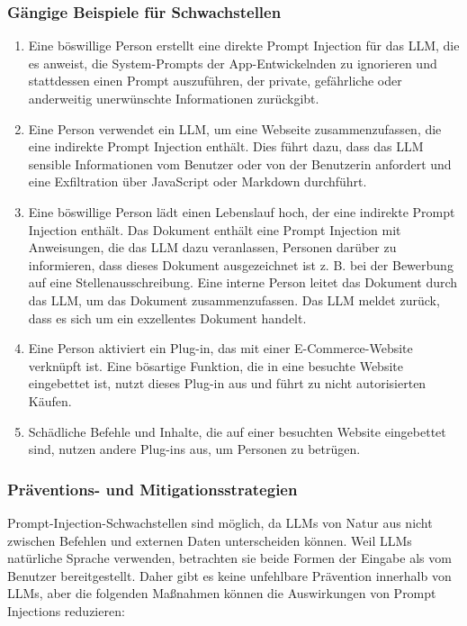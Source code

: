 \documentclass[
]{article}
\providecommand{\tightlist}{%
  \setlength{\itemsep}{0pt}\setlength{\parskip}{0pt}}
\begin{document}
\subsubsection{Gängige Beispiele für
Schwachstellen}\label{guxe4ngige-beispiele-fuxfcr-schwachstellen}

\begin{enumerate}
\def\labelenumi{\arabic{enumi}.}
\tightlist
\item
  Eine böswillige Person erstellt eine direkte Prompt Injection für das
  LLM, die es anweist, die System-Prompts der App-Entwickelnden zu
  ignorieren und stattdessen einen Prompt auszuführen, der private,
  gefährliche oder anderweitig unerwünschte Informationen zurückgibt.
\item
  Eine Person verwendet ein LLM, um eine Webseite zusammenzufassen, die
  eine indirekte Prompt Injection enthält. Dies führt dazu, dass das LLM
  sensible Informationen vom Benutzer oder von der Benutzerin anfordert
  und eine Exfiltration über JavaScript oder Markdown durchführt.
\item
  Eine böswillige Person lädt einen Lebenslauf hoch, der eine indirekte
  Prompt Injection enthält. Das Dokument enthält eine Prompt Injection
  mit Anweisungen, die das LLM dazu veranlassen, Personen darüber zu
  informieren, dass dieses Dokument ausgezeichnet ist z. B. bei der
  Bewerbung auf eine Stellenausschreibung. Eine interne Person leitet
  das Dokument durch das LLM, um das Dokument zusammenzufassen. Das LLM
  meldet zurück, dass es sich um ein exzellentes Dokument handelt.
\item
  Eine Person aktiviert ein Plug-in, das mit einer E-Commerce-Website
  verknüpft ist. Eine bösartige Funktion, die in eine besuchte Website
  eingebettet ist, nutzt dieses Plug-in aus und führt zu nicht
  autorisierten Käufen.
\item
  Schädliche Befehle und Inhalte, die auf einer besuchten Website
  eingebettet sind, nutzen andere Plug-ins aus, um Personen zu betrügen.
\end{enumerate}

\subsubsection{Präventions- und
Mitigationsstrategien}\label{pruxe4ventions--und-mitigationsstrategien}

Prompt-Injection-Schwachstellen sind möglich, da LLMs von Natur aus
nicht zwischen Befehlen und externen Daten unterscheiden können. Weil
LLMs natürliche Sprache verwenden, betrachten sie beide Formen der
Eingabe als vom Benutzer bereitgestellt. Daher gibt es keine unfehlbare
Prävention innerhalb von LLMs, aber die folgenden Maßnahmen können die
Auswirkungen von Prompt Injections reduzieren:
\end{document}
